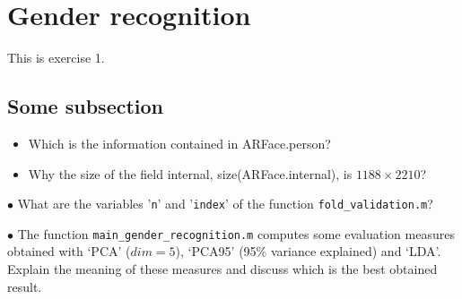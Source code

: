 \section{Gender recognition}

This is exercise 1.

\subsection{Some subsection}

\question

\begin{itemize}
	\item Which is the information contained in ARFace.person?
	\item Why the size of the field internal, size(ARFace.internal), is $ 1188 \times 2210 $?
\end{itemize}

\question

$ \bullet $ What are the variables '\texttt{n}' and '\texttt{index}' of the function \texttt{fold\_validation.m}?

\question

$ \bullet $ The function \texttt{main\_gender\_recognition.m} computes some evaluation measures obtained with `PCA'
($ dim= 5 $), `PCA95' (95\% variance explained) and `LDA'. Explain the meaning of these measures and discuss which is the best obtained result.